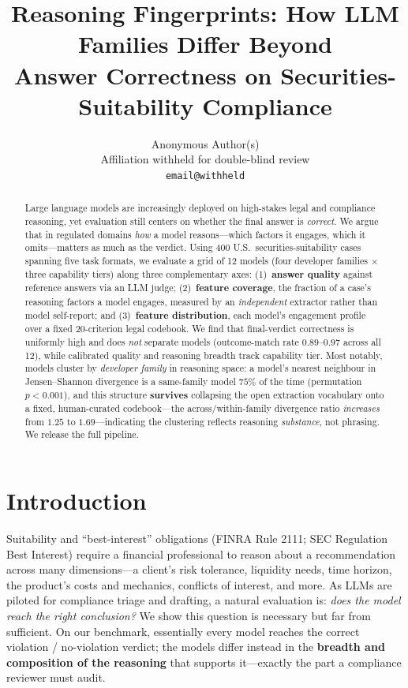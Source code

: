 \documentclass{article}
\title{Reasoning Fingerprints: How LLM Families Differ Beyond\\
       Answer Correctness on Securities-Suitability Compliance}
\author{%
  Anonymous Author(s) \\
  Affiliation withheld for double-blind review \\
  \texttt{email@withheld}
}
\begin{document}
\maketitle

\begin{abstract}
Large language models are increasingly deployed on high-stakes legal and compliance
reasoning, yet evaluation still centers on whether the final answer is \emph{correct}.
We argue that in regulated domains \emph{how} a model reasons---which factors it engages,
which it omits---matters as much as the verdict. Using 400 U.S.\ securities-suitability
cases spanning five task formats, we evaluate a grid of 12 models (four developer families
$\times$ three capability tiers) along three complementary axes: (1)~\textbf{answer quality}
against reference answers via an LLM judge; (2)~\textbf{feature coverage}, the fraction of a
case's reasoning factors a model engages, measured by an \emph{independent} extractor rather
than model self-report; and (3)~\textbf{feature distribution}, each model's engagement profile
over a fixed 20-criterion legal codebook. We find that final-verdict correctness is uniformly
high and does \emph{not} separate models (outcome-match rate $0.89$--$0.97$ across all 12),
while calibrated quality and reasoning breadth track capability tier. Most notably, models
cluster by \emph{developer family} in reasoning space: a model's nearest neighbour in
Jensen--Shannon divergence is a same-family model $75\%$ of the time (permutation $p<0.001$),
and this structure \textbf{survives} collapsing the open extraction vocabulary onto a fixed,
human-curated codebook---the across/within-family divergence ratio \emph{increases} from
$1.25$ to $1.69$---indicating the clustering reflects reasoning \emph{substance}, not phrasing.
We release the full pipeline.
\end{abstract}

\section{Introduction}

Suitability and ``best-interest'' obligations (FINRA Rule 2111; SEC Regulation Best Interest)
require a financial professional to reason about a recommendation across many dimensions---a
client's risk tolerance, liquidity needs, time horizon, the product's costs and mechanics,
conflicts of interest, and more. As LLMs are piloted for compliance triage and drafting, a
natural evaluation is: \emph{does the model reach the right conclusion?} We show this question
is necessary but far from sufficient. On our benchmark, essentially every model reaches the
correct violation / no-violation verdict; the models differ instead in the \textbf{breadth and
composition of the reasoning} that supports it---exactly the part a compliance reviewer must
audit.
\end{document}

